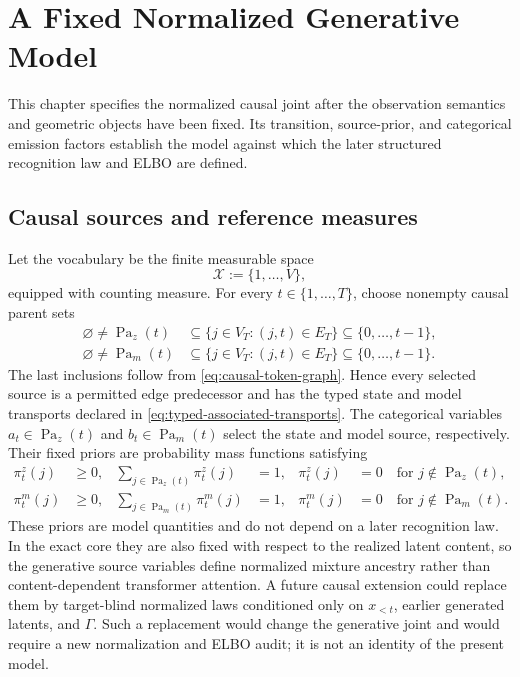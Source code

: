 \chapter{A Fixed Normalized Generative Model}

This chapter specifies the normalized causal joint after the observation semantics and geometric objects have been fixed. Its transition, source-prior, and categorical emission factors establish the model against which the later structured recognition law and ELBO are defined.

\section{Causal sources and reference measures}

Let the vocabulary be the finite measurable space
\begin{equation}
\mathcal X:=\{1,\ldots,V\},
\label{eq:vocabulary-space}
\end{equation}
equipped with counting measure.  For every $t\in\{1,\ldots,T\}$, choose nonempty causal parent sets
\begin{equation}
\begin{aligned}
\varnothing\ne\operatorname{Pa}_z(t)
&\subseteq\{j\in V_T:(j,t)\in E_T\}
\subseteq\{0,\ldots,t-1\},
\\
\varnothing\ne\operatorname{Pa}_m(t)
&\subseteq\{j\in V_T:(j,t)\in E_T\}
\subseteq\{0,\ldots,t-1\}.
\end{aligned}
\label{eq:nonempty-causal-parent-sets}
\end{equation}
The last inclusions follow from \cref{eq:causal-token-graph}.  Hence every selected source is a permitted edge predecessor and has the typed state and model transports declared in \cref{eq:typed-associated-transports}.  The categorical variables $a_t\in\operatorname{Pa}_z(t)$ and $b_t\in\operatorname{Pa}_m(t)$ select the state and model source, respectively.  Their fixed priors are probability mass functions satisfying
\begin{equation}
\begin{aligned}
\pi_t^z(j)&\geq0,
&\sum_{j\in\operatorname{Pa}_z(t)}\pi_t^z(j)&=1,
&\pi_t^z(j)&=0\quad\text{for }j\notin\operatorname{Pa}_z(t),\\
\pi_t^m(j)&\geq0,
&\sum_{j\in\operatorname{Pa}_m(t)}\pi_t^m(j)&=1,
&\pi_t^m(j)&=0\quad\text{for }j\notin\operatorname{Pa}_m(t).
\end{aligned}
\label{eq:normalized-causal-source-priors}
\end{equation}
These priors are model quantities and do not depend on a later recognition law. In the exact core they are also fixed with respect to the realized latent content, so the generative source variables define normalized mixture ancestry rather than content-dependent transformer attention. A future causal extension could replace them by target-blind normalized laws conditioned only on $x_{<t}$, earlier generated latents, and $\Gamma$. Such a replacement would change the generative joint and would require a new normalization and ELBO audit; it is not an identity of the present model.

